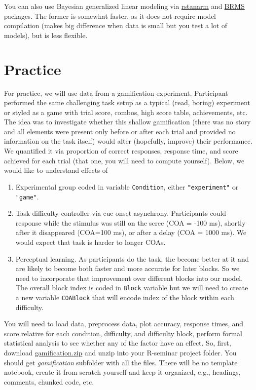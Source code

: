 \documentclass[
]{book}
\providecommand{\tightlist}{%
  \setlength{\itemsep}{0pt}\setlength{\parskip}{0pt}}
\begin{document}
You can also use Bayesian generalized linear modeling via \href{https://mc-stan.org/rstanarm/}{rstanarm} and \href{https://github.com/paul-buerkner/brms}{BRMS} packages. The former is somewhat faster, as it does not require model compilation (makes big difference when data is small but you test a lot of models), but is less flexible.

\hypertarget{practice}{%
\section{Practice}\label{practice}}

For practice, we will use data from a gamification experiment. Participant performed the same challenging task setup as a typical (read, boring) experiment or styled as a game with trial score, combos, high score table, achievements, etc. The idea was to investigate whether this shallow gamification (there was no story and all elements were present only before or after each trial and provided no information on the task itself) would alter (hopefully, improve) their performance. We quantified it via proportion of correct responses, response time, and score achieved for each trial (that one, you will need to compute yourself). Below, we would like to understand effects of

\begin{enumerate}
\def\labelenumi{\arabic{enumi}.}
\tightlist
\item
  Experimental group coded in variable \texttt{Condition}, either \texttt{"experiment"} or \texttt{"game"}.
\item
  Task difficulty controller via cue-onset asynchrony. Participants could response while the stimulus was still on the scree (COA = -100 ms), shortly after it disappeared (COA=100 ms), or after a delay (COA = 1000 ms). We would expect that task is harder to longer COAs.
\item
  Perceptual learning. As participants do the task, the become better at it and are likely to become both faster and more accurate for later blocks. So we need to incorporate that improvement over different blocks into our model. The overall block index is coded in \texttt{Block} variable but we will need to create a new variable \texttt{COABlock} that will encode index of the block within each difficulty.
\end{enumerate}

You will need to load data, preprocess data, plot accuracy, response times, and score relative for each condition, difficulty, and difficulty block, perform formal statistical analysis to see whether any of the factor have an effect. So, first, download \href{data/gamification.zip}{gamification.zip} and unzip into your R-seminar project folder. You should get \emph{gamification} subfolder with all the files. There will be no template notebook, create it from scratch yourself and keep it organized, e.g., headings, comments, chunked code, etc.
\end{document}
